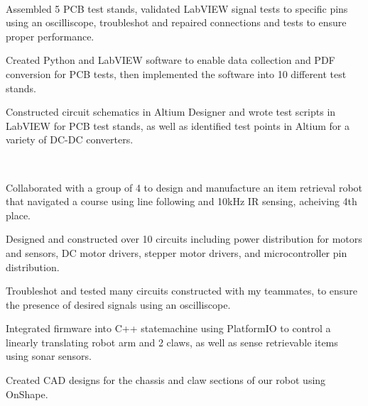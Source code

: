 \documentclass[a4paper]{MagicalCV}
\begin{document}
\begin{minipage}[t]{0.72\textwidth} 


 \\
\vspace{\topsep} %
\begin{tightemize}
\item Assembled 5 PCB test stands, validated LabVIEW signal tests to specific pins using an oscilliscope, troubleshot and repaired connections and tests to ensure proper performance.
\item Created Python and LabVIEW software to enable data collection and PDF conversion for PCB tests, then implemented the software into 10 different test stands. 
\item Constructed circuit schematics in Altium Designer and wrote test scripts in LabVIEW for PCB test stands, as well as identified test points in Altium for a variety of DC-DC converters.  
\end{tightemize}


 \\
\begin{tightemize}
    \item Collaborated with a group of 4 to design and manufacture an item retrieval robot that navigated a course using line following and 10kHz IR sensing, acheiving 4th place.
    \item Designed and constructed over 10 circuits including power distribution for motors and sensors, DC motor drivers, stepper motor drivers, and microcontroller pin distribution.
    \item Troubleshot and tested many circuits constructed with my teammates, to ensure the presence of desired signals using an oscilliscope.
    \item Integrated firmware into C++ statemachine using PlatformIO to control a linearly translating robot arm and 2 claws, as well as sense retrievable items using sonar sensors. 
    \item Created CAD designs for the chassis and claw sections of our robot using OnShape.  
\end{tightemize}
\sectionsep


\end{minipage}
\end{document}
